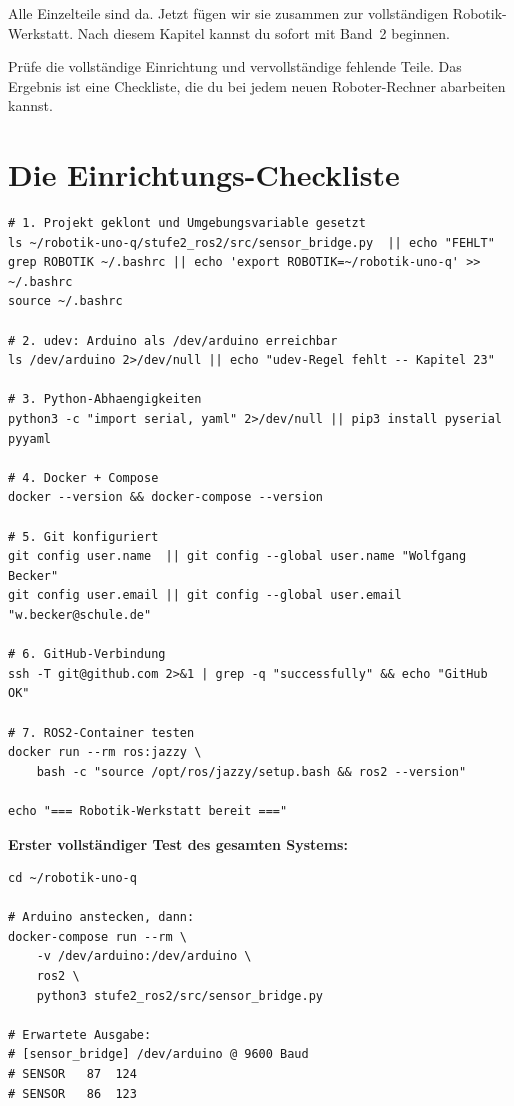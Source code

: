 Alle Einzelteile sind da. Jetzt fügen wir sie zusammen
zur vollständigen Robotik-Werkstatt. Nach diesem Kapitel
kannst du sofort mit Band~2 beginnen.

\begin{aufgabeBox}
Prüfe die vollständige Einrichtung und vervollständige
fehlende Teile. Das Ergebnis ist eine Checkliste,
die du bei jedem neuen Roboter-Rechner abarbeiten kannst.
\end{aufgabeBox}

\section{Die Einrichtungs-Checkliste}

\begin{lstlisting}[style=bash]
# 1. Projekt geklont und Umgebungsvariable gesetzt
ls ~/robotik-uno-q/stufe2_ros2/src/sensor_bridge.py  || echo "FEHLT"
grep ROBOTIK ~/.bashrc || echo 'export ROBOTIK=~/robotik-uno-q' >> ~/.bashrc
source ~/.bashrc

# 2. udev: Arduino als /dev/arduino erreichbar
ls /dev/arduino 2>/dev/null || echo "udev-Regel fehlt -- Kapitel 23"

# 3. Python-Abhaengigkeiten
python3 -c "import serial, yaml" 2>/dev/null || pip3 install pyserial pyyaml

# 4. Docker + Compose
docker --version && docker-compose --version

# 5. Git konfiguriert
git config user.name  || git config --global user.name "Wolfgang Becker"
git config user.email || git config --global user.email "w.becker@schule.de"

# 6. GitHub-Verbindung
ssh -T git@github.com 2>&1 | grep -q "successfully" && echo "GitHub OK"

# 7. ROS2-Container testen
docker run --rm ros:jazzy \
    bash -c "source /opt/ros/jazzy/setup.bash && ros2 --version"

echo "=== Robotik-Werkstatt bereit ==="
\end{lstlisting}

\begin{loesungBox}
\textbf{Erster vollständiger Test des gesamten Systems:}
\begin{lstlisting}[style=bash]
cd ~/robotik-uno-q

# Arduino anstecken, dann:
docker-compose run --rm \
    -v /dev/arduino:/dev/arduino \
    ros2 \
    python3 stufe2_ros2/src/sensor_bridge.py

# Erwartete Ausgabe:
# [sensor_bridge] /dev/arduino @ 9600 Baud
# SENSOR   87  124
# SENSOR   86  123
\end{lstlisting}
\end{loesungBox}

